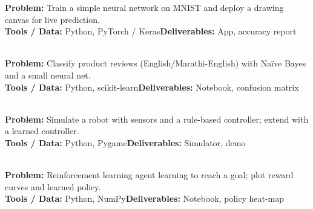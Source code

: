 \documentclass[11pt]{article}
\begin{document}
\begin{tcolorbox}[enhanced,breakable,colback=white,colframe=teal,arc=2mm,boxrule=0.9pt,
  title={\textbf{PV.06\quad Handwritten Digit Recogniser}\hfill \colorbox{white}{\textcolor{teal}{\scriptsize\bfseries MINI}}},fonttitle=\color{white},colbacktitle=teal]
\textbf{\color{navy}Problem:} Train a simple neural network on MNIST and deploy a drawing canvas for live prediction.\\[2pt]
\textbf{\color{navy}Tools / Data:} Python, PyTorch / Keras\qquad \textbf{\color{navy}Deliverables:} App, accuracy report\\[2pt]
\ 
\end{tcolorbox}
\begin{tcolorbox}[enhanced,breakable,colback=white,colframe=teal,arc=2mm,boxrule=0.9pt,
  title={\textbf{PV.07\quad Sentiment Analyser for Reviews}\hfill \colorbox{white}{\textcolor{teal}{\scriptsize\bfseries MINI}}},fonttitle=\color{white},colbacktitle=teal]
\textbf{\color{navy}Problem:} Classify product reviews (English/Marathi-English) with Na\"{i}ve Bayes and a small neural net.\\[2pt]
\textbf{\color{navy}Tools / Data:} Python, scikit-learn\qquad \textbf{\color{navy}Deliverables:} Notebook, confusion matrix\\[2pt]
\ 
\end{tcolorbox}
\begin{tcolorbox}[enhanced,breakable,colback=white,colframe=teal,arc=2mm,boxrule=0.9pt,
  title={\textbf{PV.08\quad Line-Following Robot Simulator}\hfill \colorbox{white}{\textcolor{teal}{\scriptsize\bfseries MINI}}},fonttitle=\color{white},colbacktitle=teal]
\textbf{\color{navy}Problem:} Simulate a robot with sensors and a rule-based controller; extend with a learned controller.\\[2pt]
\textbf{\color{navy}Tools / Data:} Python, Pygame\qquad \textbf{\color{navy}Deliverables:} Simulator, demo\\[2pt]
\ 
\end{tcolorbox}
\begin{tcolorbox}[enhanced,breakable,colback=white,colframe=teal,arc=2mm,boxrule=0.9pt,
  title={\textbf{PV.09\quad Q-Learning Grid World}\hfill \colorbox{white}{\textcolor{teal}{\scriptsize\bfseries MINI}}},fonttitle=\color{white},colbacktitle=teal]
\textbf{\color{navy}Problem:} Reinforcement learning agent learning to reach a goal; plot reward curves and learned policy.\\[2pt]
\textbf{\color{navy}Tools / Data:} Python, NumPy\qquad \textbf{\color{navy}Deliverables:} Notebook, policy heat-map\\[2pt]
\ 
\end{tcolorbox}
\end{document}
